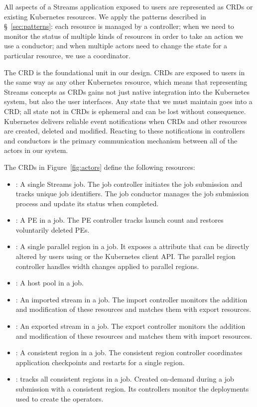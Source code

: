 All aspects of a Streams application exposed to users are represented as CRDs or
existing Kubernetes resources. We apply the patterns described in
\S~\ref{sec:patterns}: each resource is managed by a controller; when we
need to monitor the status of multiple kinds of resources in order to take an
action we use a conductor; and when multiple actors need to change the state for
a particular resource, we use a coordinator.

The CRD is the foundational unit in our design. CRDs are exposed to users in the
same way as any other Kubernetes resource, which means that representing Streams
concepts as CRDs gains not just native integration into the Kubernetes system,
but also the user interfaces. Any state that we must maintain goes into a CRD;
all state not in CRDs is ephemeral and can be lost without consequence.
Kubernetes delivers reliable event notifications when CRDs and other resources
are created, deleted and modified. Reacting to these notifications in
controllers and conductors is the primary communication mechanism between all of
the actors in our system.

The CRDs in Figure~\ref{fig:actors} define the following resources:

\begin{itemize}
    \item {}: A single Streams job. The job 
        controller initiates the job submission and tracks unique job identifiers. 
        The job conductor manages the job submission process and update 
        its status when completed.
    \item {}: A PE in a job. The 
        PE controller tracks launch count and restores voluntarily deleted PEs.
    \item {}: A single parallel region in a job. It 
        exposes a  attribute that can be directly altered by users using 
         or the Kubernetes client API. The parallel region
        controller handles width changes applied to parallel regions.
   \item {}: A host pool in a job.
   \item {}: An imported stream in a job. The import
       controller monitors the addition and modification of these resources and 
       matches them with export resources.
   \item {}: An exported stream in a job. The export
       controller monitors the addition and modification of these resources and 
       matches them with import resources.
    \item {}: A consistent region in a job. The 
        consistent region controller coordinates application checkpoints and 
        restarts for a single region.
    \item {}: tracks all consistent regions in a 
        job. Created on-demand during a job submission with a consistent region.
        Its controllers monitor the deployments used to create the operators.
\end{itemize}


